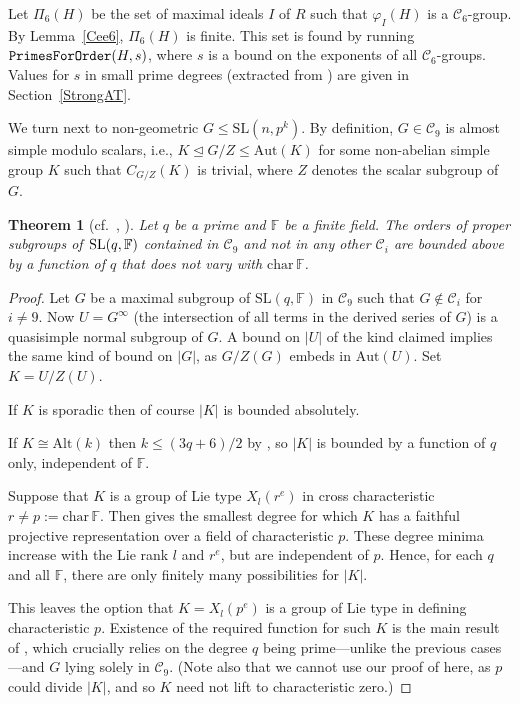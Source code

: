 \documentclass[11pt]{amsart}
\newtheorem{theorem}{Theorem}[section]
\theoremstyle{definition}
\theoremstyle{remark}
\newcommand{\F}{\mathbb{F}}
\newcommand{\SL}{\mathrm{SL}}
\newcommand{\calc}{\mathscr{C}}
\newcommand{\cha}{\mathrm{char}\hspace{2pt}}
\begin{document}
Let $\Pi_6(H)$ be the set of maximal ideals $I$ of $R$ such that 
$\varphi_I(H)$ is a $\calc_6$-group. By Lemma~\ref{Cee6},
 $\Pi_6(H)$ is finite. This set is found by running
${\tt PrimesForOrder}(H, s)$, where $s$ is a bound on the exponents
of all $\calc_6$-groups. Values for $s$ in small prime degrees  
(extracted from \cite[Chapter 8]{Brayetal}) are given in 
Section~\ref{StrongAT}.

We turn next to non-geometric $G\leq \SL(n,p^k)$.
By definition, $G\in \calc_9$ is almost simple modulo scalars, i.e., 
$K\unlhd G/Z\leq \mathrm{Aut}(K)$
for some non-abelian simple group $K$ such that $C_{G/Z}(K)$
is trivial, where $Z$ denotes the scalar subgroup of $G$. 
\begin{theorem}[{cf.~\cite[Lemma~3.1]{ExpMath}, \cite[Theorem~2.3]{SAT}}] 
\label{ZalesskiCee9}
Let $q$ be a prime and $\F$ be a finite field. The orders of proper 
subgroups of $\hspace{.5pt} \SL(q,\F)$ contained in $\mathscr{C}_9$ and 
not in any other $\mathscr{C}_i$ are bounded above by a function of $q$ 
that does not vary with $\cha \F$.
\end{theorem}
\begin{proof}
Let $G$ be a maximal subgroup of $\SL(q,\F)$ in $\mathscr{C}_9$ such that 
$G\not \in \mathscr{C}_i$ for $i\neq 9$. Now $U= G^\infty$ 	(the intersection
 of all terms in the derived series of $G$) is a quasisimple normal subgroup 
of $G$. A bound on $|U|$ of the kind claimed implies the same
kind of bound on $|G|$, as $G/Z(G)$ embeds in $\mathrm{Aut}(U)$.  
Set $K= U/Z(U)$.

If $K$ is sporadic then of course $|K|$ is bounded absolutely.

If $K\cong \mathrm{Alt}(k)$ then $k\leq (3q+6)/2$ by 
\cite[Proposition~10, p.~333]{LubotzkySegal}, so $|K|$ is
bounded by a function of $q$ only, independent of $\F$.

Suppose that $K$ is a group of Lie type $X_l(r^e)$ in cross characteristic 
$r\neq p:= \cha \F$. Then \cite[Table~1]{SeitzZalesski} gives the smallest 
degree for which $K$ has a faithful projective representation over a 
field of characteristic $p$. These degree minima increase with 
the Lie rank $l$ and $r^e$, but are independent of $p$. Hence, for each $q$ 
and all $\F$, there are only finitely many possibilities for $|K|$.

This leaves the option that $K=X_l(p^e)$ is a group of Lie type in defining
 characteristic $p$. Existence of the required function for such $K$ is 
the main result of \cite{ZalesskiPreprint},
which crucially relies on the degree $q$ being prime---unlike 
the previous cases---and $G$ lying solely in $\mathscr{C}_9$. 
(Note also that we cannot use our proof of 
\cite[Lemma~3.1]{ExpMath} here, as $p$ could divide $|K|$, and so 
$K$ need not lift to characteristic zero.)
\end{proof}
\end{document}
